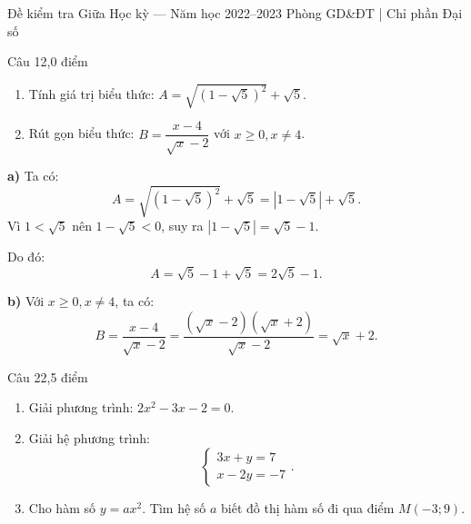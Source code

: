 ﻿%
%
  {Đề kiểm tra Giữa Học kỳ — Năm học 2022--2023}%
  {Phòng GD\&ĐT | Chỉ phần Đại số}

\begin{de_cau}{Câu 1}{2,0 điểm}
\begin{enumerate}[label=\alph*)]
  \item Tính giá trị biểu thức: $A = \sqrt{(1-\sqrt{5})^2} + \sqrt{5}$.
  \item Rút gọn biểu thức: $B = \dfrac{x-4}{\sqrt{x}-2}$ với $x \ge 0, x \neq 4$.
\end{enumerate}
\end{de_cau}

\begin{loi_giai_cau}
\textbf{a)} Ta có:
\[A = \sqrt{(1-\sqrt{5})^2} + \sqrt{5} = |1-\sqrt{5}| + \sqrt{5}.\]
Vì $1 < \sqrt{5}$ nên $1 - \sqrt{5} < 0$, suy ra $|1-\sqrt{5}| = \sqrt{5} - 1$.

Do đó:
\[A = \sqrt{5} - 1 + \sqrt{5} = \boxed{2\sqrt{5} - 1}.\]

\textbf{b)} Với $x \ge 0, x \neq 4$, ta có:
\[B = \dfrac{x-4}{\sqrt{x}-2} = \dfrac{(\sqrt{x}-2)(\sqrt{x}+2)}{\sqrt{x}-2} = \boxed{\sqrt{x}+2}.\]
\end{loi_giai_cau}

\begin{de_cau}{Câu 2}{2,5 điểm}
\begin{enumerate}[label=\alph*)]
  \item Giải phương trình: $2x^2 - 3x - 2 = 0$.
  \item Giải hệ phương trình:
  \[\begin{cases} 3x + y = 7 \\ x - 2y = -7 \end{cases}.\]
  \item Cho hàm số $y = ax^2$. Tìm hệ số $a$ biết đồ thị hàm số đi qua điểm $M(-3; 9)$.
\end{enumerate}
\end{de_cau}

